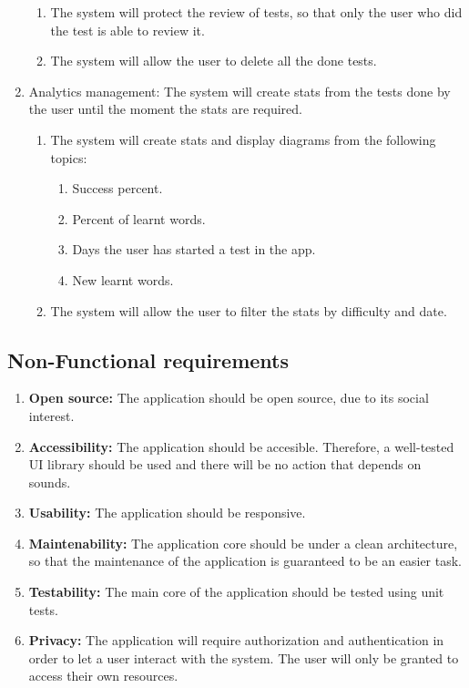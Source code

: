 \begin{enumerate}[label=\textbf{RF\_\arabic*}, align=left, leftmargin=*]
\begin{enumerate}[label=\textbf{\theenumi.\arabic*}, align=left, leftmargin=*]
            \item The system will protect the review of tests, so that only the user who did the test is able to review it.
            \item The system will allow the user to delete all the done tests.
        \end{enumerate}
    \item Analytics management: The system will create stats from the tests done by the user until the moment the stats are required.
        \begin{enumerate}[label=\textbf{\theenumi.\arabic*}, align=left, leftmargin=*]
            \item The system will create stats and display diagrams from the following topics:
                \begin{enumerate}
                    \item Success percent.
                    \item Percent of learnt words.
                    \item Days the user has started a test in the app.
                    \item New learnt words.
                \end{enumerate}
            \item The system will allow the user to filter the stats by difficulty and date.
        \end{enumerate}
\end{enumerate}

\subsection{Non-Functional requirements}
\begin{enumerate}[label=\textbf{RNF\_\arabic*}, align=left, leftmargin=*]
    \item \textbf{Open source:} The application should be open source, due to its social interest.
    \item \textbf{Accessibility: } The application should be accesible. Therefore, a well-tested UI library should be used and there will be no action that depends on sounds.
    \item \textbf{Usability:} The application should be responsive.
    \item \textbf{Maintenability:} The application core should be under a clean architecture, so that the maintenance of the application is guaranteed to be an easier task.
    \item \textbf{Testability:} The main core of the application should be tested using unit tests.
    \item \textbf{Privacy:} The application will require authorization and authentication in order to let a user interact with the system. The user will only be granted to access their own resources.
\end{enumerate}

